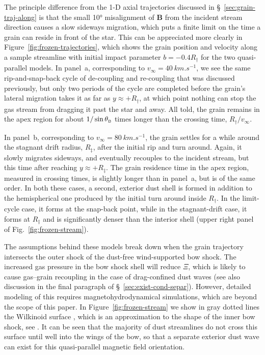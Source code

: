 The principle difference from the 1-D axial trajectories discussed in
\S~\ref{sec:grain-traj-along} is that the small \ang{10} misalignment
of \(\bm{B}\) from the incident stream direction causes a slow
sideways migration, which puts a finite limit on the time a grain can
reside in front of the star.  This can be appreciated more clearly in
Figure~\ref{fig:frozen-trajectories}, which shows the grain position
and velocity along a sample streamline with initial impact parameter
\(b = -0.4 R_\dag\) for the two quasi-parallel models.  In panel~a,
corresponding to \(v_\infty = \SI{40}{km.s^{-1}}\), we see the same
rip-and-snap-back cycle of de-coupling and re-coupling that was
discussed previously, but only two periods of the cycle are completed
before the grain's lateral migration takes it as far as
\(y \approx +R_\dag\), at which point nothing can stop the gas stream from
dragging it past the star and away.  All told, the grain remains in
the apex region for about \(1/\sin\theta_{\scriptscriptstyle\text{B}}\) times longer than the crossing
time, \(R_\dag / v_\infty\).

In panel~b, corresponding to \(v_\infty = \SI{80}{km.s^{-1}}\), the grain
settles for a while around the stagnant drift radius, \(R_\ddag\), after
the initial rip and turn around.  Again, it slowly migrates sideways,
and eventually recouples to the incident stream, but this time after
reaching \(y \approx +R_\ddag\).  The grain residence time in the apex region,
measured in crossing times, is slightly longer than in panel~a, but is
of the same order.  In both these cases, a second, exterior dust
shell is formed in addition to the hemispherical one produced by the
initial turn around inside \(R_\dag\). In the limit-cycle case, it forms
at the snap-back point, while in the stagnant-drift case, it forms at
\(R_\ddag\) and is significantly denser than the interior shell (upper
right panel of Fig.~\ref{fig:frozen-stream}).

The assumptions behind these models break down when the grain
trajectory intersects the outer shock of the dust-free wind-supported
bow shock.  The increased gas pressure in the bow shock shell will
reduce \(\Xi\), which is likely to cause gas--grain recoupling in the
case of drag-confined dust waves (see also discussion in the final
paragraph of \S~\ref{sec:exist-cond-separ}).  However, detailed
modeling of this requires magnetohydrodynamical simulations, which are
beyond the scope of this paper.  In Figure~\ref{fig:frozen-stream} we
show in gray dotted lines the Wilkinoid surface \citep{Wilkin:1996a},
which is an approximation to the shape of the inner bow shock, see
\citet{Tarango-Yong:2018a}.  It can be seen that the majority of dust
streamlines do not cross this surface until well into the wings of the
bow, so that a separate exterior dust wave can exist for this
quasi-parallel magnetic field orientation.

